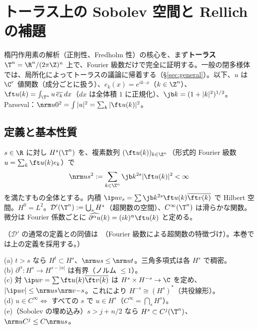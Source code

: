 
\section{トーラス上の Sobolev 空間と Rellich の補題}\label{sec:sobolev}
楕円作用素の解析（正則性、Fredholm 性）の核心を、まず\textbf{トーラス} $\T^n=\R^n/(2\pi\Z)^n$ 上で、Fourier 級数だけで完全に証明する。一般の閉多様体では、局所化によってトーラスの議論に帰着する（\S\ref{sec:general}）。以下、$u$ は $\C^r$ 値関数（成分ごとに扱う）、$e_k(x)=e^{ik\cdot x}$（$k\in\Z^n$）、$\ft u(k)=\int_{\T^n}u\,\overline{e_k}\,dx$（$dx$ は全体積 $1$ に正規化）、$\jb k=(1+|k|^2)^{1/2}$。Parseval：$\nrm u0^2=\int|u|^2=\sum_k|\ft u(k)|^2$。

\subsection{定義と基本性質}
\begin{defn}[Sobolev 空間]\label{def:Hs}
$s\in\R$ に対し $H^s(\T^n)$ を、複素数列 $(\ft u(k))_{k\in\Z^n}$（形式的 Fourier 級数 $u=\sum_k\ft u(k)e_k$）で
\[
\nrm us^2:=\sum_{k\in\Z^n}\jb k^{2s}|\ft u(k)|^2<\infty
\]
を満たすもの全体とする。内積 $\ip uv_s=\sum\jb k^{2s}\ft u(k)\overline{\ft v(k)}$ で Hilbert 空間。$H^0=L^2$。$\mathcal D'(\T^n):=\bigcup_sH^s$（超関数の空間）、$C^\infty(\T^n)$ は滑らかな関数。微分は Fourier 係数ごとに $\widehat{\partial^\alpha u}(k)=(ik)^\alpha\ft u(k)$ と定める。
\end{defn}
（$\mathcal D'$ の通常の定義との同値は\tC\ （Fourier 級数による超関数の特徴づけ）。本巻では上の定義を採用する。）
\begin{prop}\label{prop:Hsbasic}\tP
(a) $t>s$ なら $H^t\subset H^s$、$\nrm us\le\nrm ut$。三角多項式は各 $H^s$ で稠密。\\
(b) $\partial^\alpha:H^s\to H^{s-|\alpha|}$ は有界（ノルム $\le1$）。\\
(c) 対 $\ip uv=\sum\ft u(k)\overline{\ft v(k)}$ は $H^s\times H^{-s}\to\C$ を定め、$|\ip uv|\le\nrm us\nrm v{-s}$。これにより $H^{-s}\cong(H^s)^*$（共役線形）。\\
(d) $u\in C^\infty\iff$ すべての $s$ で $u\in H^s$（$C^\infty=\bigcap_sH^s$）。\\
(e)（Sobolev の埋め込み）$s>j+n/2$ なら $H^s\subset C^j(\T^n)$、$\nrm u{C^j}\le C\nrm us$。
\end{prop}
